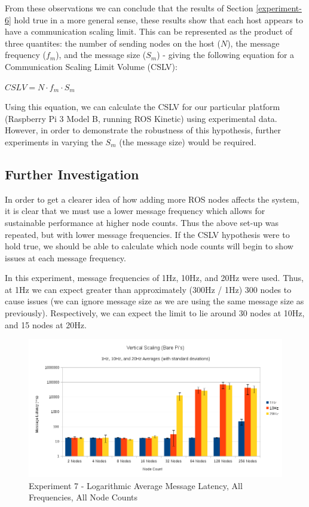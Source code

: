 \documentclass[../dissertation.tex]{subfiles}
\begin{document}
From these observations we can conclude that the results of Section \ref{experiment-6} hold true in a more general sense, these results show that each host appears to have a communication scaling limit. This can be represented as the product of three quantites: the number of sending nodes on the host ($N$), the message frequency ($f_m$), and the message size ($S_m$) - giving the following equation for a Communication Scaling Limit Volume (CSLV):

\begin{center}
$CSLV = N \cdot f_m \cdot S_m$
\end{center}

Using this equation, we can calculate the CSLV for our particular platform (Raspberry Pi 3 Model B, running ROS Kinetic) using experimental data. However, in order to demonstrate the robustness of this hypothesis, further experiments in varying the $S_m$ (the message size) would be required.

\subsection{Further Investigation}
\label{exp-7-further}

In order to get a clearer idea of how adding more ROS nodes affects the system, it is clear that we must use a lower message frequency which allows for sustainable performance at higher node counts. Thus the above set-up was repeated, but with lower message frequencies. If the CSLV hypothesis were to hold true, we should be able to calculate which node counts will begin to show issues at each message frequency.

In this experiment, message frequencies of 1Hz, 10Hz, and 20Hz were used. Thus, at 1Hz we can expect greater than approximately (300Hz / 1Hz) 300 nodes to cause issues (we can ignore message size as we are using the same message size as previously). Respectively, we can expect the limit to lie around 30 nodes at 10Hz, and 15 nodes at 20Hz.

\begin{figure}[H]
\centering
\includegraphics[width=\textwidth]{images/experiment8/vertical_scaling_all_freqs_log_avg_msg_latency.png}
\caption{Experiment 7 - Logarithmic Average Message Latency, All Frequencies, All Node Counts}
\label{exp7-further-all-freqs-averages}
\end{figure}
\end{document}
